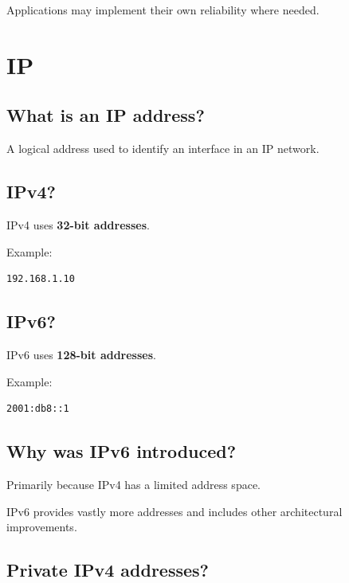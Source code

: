 Applications may implement their own reliability where needed.

\medskip

\section{IP}

\subsection{What is an IP address?}

A logical address used to identify an interface in an IP network.

\medskip

\subsection{IPv4?}

IPv4 uses \textbf{32-bit addresses}.

Example:

\begin{lstlisting}
192.168.1.10
\end{lstlisting}

\medskip

\subsection{IPv6?}

IPv6 uses \textbf{128-bit addresses}.

Example:

\begin{lstlisting}
2001:db8::1
\end{lstlisting}

\medskip

\subsection{Why was IPv6 introduced?}

Primarily because IPv4 has a limited address space.

IPv6 provides vastly more addresses and includes other architectural improvements.

\medskip

\subsection{Private IPv4 addresses?}

